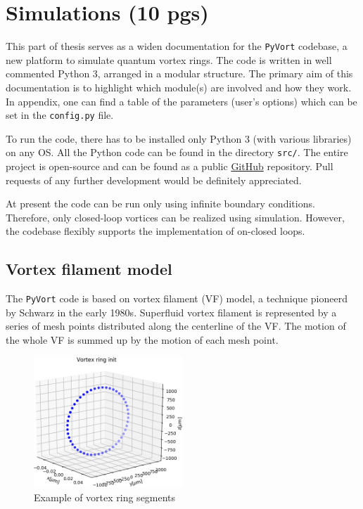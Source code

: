 \chapter{Simulations (10 pgs)}

This part of thesis serves as a widen documentation for the \texttt{PyVort} codebase, a new platform to simulate quantum vortex rings. The code is written in well commented Python 3, arranged in a modular structure. The primary aim of this documentation is to highlight which module(s) are involved and how they work.
In appendix, one can find a table of the parameters (user's options) which can be set in the \texttt{config.py} file.

To run the code, there has to be installed only Python 3 (with various libraries) on any OS. All the Python code can be found in the directory \texttt{src/}. The entire project is open-source and can be found as a public \href{https://github.com/KuboBahyl/superfluid}{GitHub} repository. Pull requests of any further development would be definitely appreciated.

At present the code can be run only using infinite boundary conditions. Therefore, only closed-loop vortices can be realized using simulation. However, the codebase flexibly supports the implementation of on-closed loops.

\section{Vortex filament model}

The \texttt{PyVort} code is based on vortex filament (VF) model, a technique pioneerd by Schwarz in the early 1980s. Superfluid vortex filament is represented by a series of mesh points distributed along the centerline of the VF. The motion of the whole VF is summed up by the motion of each mesh point.

\begin{figure}[h]
	\centering
	\includegraphics[width=0.5\textwidth]{graphics/simul/ring_init_crop}
	\caption{Example of vortex ring segments}
\end{figure}


